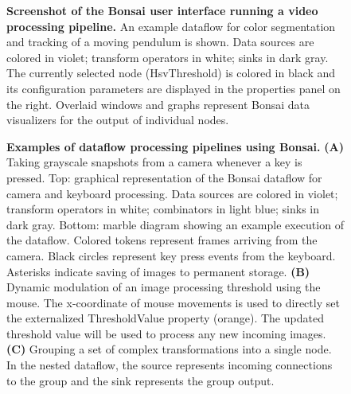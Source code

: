 \begin{figure}
\begin{center}
\end{center}
\vspace{-5mm}
\caption{\textbf{Screenshot of the Bonsai user interface running a video processing pipeline.} An example dataflow for color segmentation and tracking of a moving pendulum is shown. Data sources are colored in violet; transform operators in white; sinks in dark gray. The currently selected node (HsvThreshold) is colored in black and its configuration parameters are displayed in the properties panel on the right. Overlaid windows and graphs represent Bonsai data visualizers for the output of individual nodes.}
\label{fig:bonsaiInterface}
\end{figure}

\begin{figure}
\begin{center}
\scalebox{0.5}{}
\end{center}
\vspace{-5mm}
\caption{\textbf{Examples of dataflow processing pipelines using Bonsai.} \textbf{(A)} Taking grayscale snapshots from a camera whenever a key is pressed. Top: graphical representation of the Bonsai dataflow for camera and keyboard processing. Data sources are colored in violet; transform operators in white; combinators in light blue; sinks in dark gray. Bottom: marble diagram showing an example execution of the dataflow. Colored tokens represent frames arriving from the camera. Black circles represent key press events from the keyboard. Asterisks indicate saving of images to permanent storage. \textbf{(B)} Dynamic modulation of an image processing threshold using the mouse. The x-coordinate of mouse movements is used to directly set the externalized ThresholdValue property (orange). The updated threshold value will be used to process any new incoming images. \textbf{(C)} Grouping a set of complex transformations into a single node. In the nested dataflow, the source represents incoming connections to the group and the sink represents the group output.}
\label{fig:bonsaiExamples}
\end{figure}

